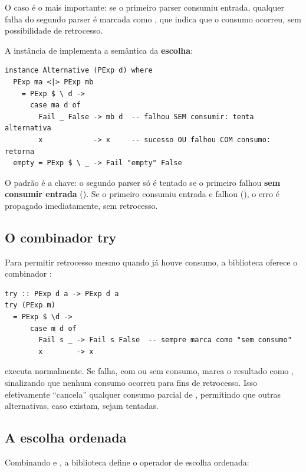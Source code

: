 O caso  é o mais importante: se
o primeiro parser consumiu entrada, qualquer falha do segundo parser
é marcada como , que indica que o consumo
ocorreu, sem possibilidade de retrocesso.

A instância de  implementa a
semântica da \textbf{escolha}:

\begin{verbatim}
instance Alternative (PExp d) where
  PExp ma <|> PExp mb
    = PExp $ \ d ->
      case ma d of
        Fail _ False -> mb d  -- falhou SEM consumir: tenta alternativa
        x            -> x     -- sucesso OU falhou COM consumo: retorna
  empty = PExp $ \ _ -> Fail "empty" False
\end{verbatim}

O padrão  é a chave: o segundo
parser  só é tentado se o primeiro falhou
\textbf{sem consumir entrada} (). Se o
primeiro consumiu entrada e falhou (),
o erro é propagado imediatamente, sem retrocesso.

\subsection{O combinador try}

Para permitir retrocesso mesmo quando já houve consumo, a biblioteca
oferece o combinador :

\begin{verbatim}
try :: PExp d a -> PExp d a
try (PExp m)
  = PExp $ \d ->
      case m d of
        Fail s _ -> Fail s False  -- sempre marca como "sem consumo"
        x        -> x
\end{verbatim}

 executa 
normalmente. Se  falha, com ou sem
consumo,  marca o resultado como
, sinalizando que nenhum
consumo ocorreu para fins de retrocesso. Isso efetivamente
``cancela'' qualquer consumo parcial de ,
permitindo que outras alternativas, caso existam, sejam tentadas.

\subsection{A escolha ordenada}

Combinando  e \haskell{<|>}, a biblioteca define
o operador de escolha ordenada:

